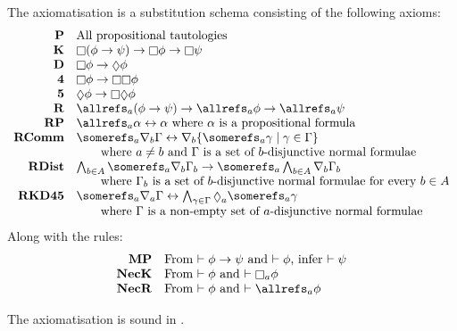 \begin{definition}
The axiomatisation \axiomKDF{} is a substitution schema consisting of the
following axioms:
$$
\begin{array}{rl}
{\bf P} & \text{All propositional tautologies}\\
{\bf K} & \knows (\phi \implies \psi) \implies \knows \phi \implies \knows
\psi\\
{\bf D} & \knows \phi \implies \suspects \phi\\
{\bf 4} & \knows \phi \implies \knows \knows \phi\\
{\bf 5} & \suspects \phi \implies \knows \suspects \phi\\
{\bf R} & \allrefs_a (\phi \implies \psi) \implies \allrefs_a \phi \implies
\allrefs_a \psi\\
{\bf RP} & \allrefs_a \alpha \iff \alpha \text{ where $\alpha$ is a
propositional formula}\\
{\bf RComm} & \somerefs_a \covers_b \Gamma \iff \covers_b \{\somerefs_a \gamma
\mid \gamma \in \Gamma\}\\ 
&\qquad\text{where $a \neq b$ and $\Gamma$ is a set of $b$-disjunctive normal formulae}\\
{\bf RDist} & \bigwedge_{b \in A} \somerefs_a \covers_b \Gamma_b \implies
\somerefs_a \bigwedge_{b \in A} \covers_b \Gamma_b\\
&\qquad\text{where $\Gamma_b$ is a set of $b$-disjunctive normal formulae for every $b \in A$}\\
{\bf RKD45} & \somerefs_a \covers_a \Gamma \iff \bigwedge_{\gamma \in \Gamma}
\suspects_a \somerefs_a \gamma\\
&\qquad\text{where $\Gamma$ is a non-empty set of $a$-disjunctive
normal formulae}\\
\end{array}
$$
Along with the rules:
$$
\begin{array}{rl}
{\bf MP} & \text{From $\proves \phi \implies \psi$ and $\proves \phi$, infer
$\proves \psi$}\\
{\bf NecK} & \text{From $\proves \phi$ and $\proves \knows_a \phi$}\\
{\bf NecR} & \text{From $\proves \phi$ and $\proves \allrefs_a \phi$}
\end{array}
$$
\end{definition}

\begin{lemma}\label{kd45-sound}
The axiomatisation \axiomKDF{} is sound in \logicKDF{}.
\end{lemma}

